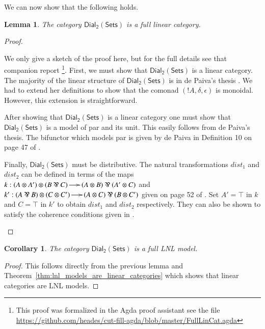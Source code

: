 \documentclass[preprint,6pt]{elsarticle}
\newcommand{\dial}[0]{\mathsf{Dial_2}(\mathsf{Sets})}
\newtheorem{lemma}[theorem]{Lemma}
\newtheorem{corollary}[theorem]{Corollary}
\begin{document}
We can now show that the following holds.
\begin{lemma}
  \label{lemma:ddial_is_a_linear_category}
  The category $\dial$ is a full linear category.
\end{lemma}
\begin{proof}
  \begin{paper}
    We only give a sketch of the proof here, but for the full details
    see that companion report \cite{Eades:2015}\footnote{This proof
      was formalized in the Agda proof assistant see the file
      \url{https://github.com/heades/cut-fill-agda/blob/master/FullLinCat.agda}}. First,
    we must show that $\dial$ is a linear category.  The majority of
    the linear structure of $\dial$ is in de Paiva's thesis
    \cite{dePaiva:1988}.  We had to extend her definitions to show
    that the comonad $(!A,\delta,\epsilon)$ is monoidal. However, this extension
    is straightforward.

    After showing that $\dial$ is a linear category one must show that
    $\dial$ is a model of par and its unit.  This easily follows from
    de Paiva's thesis.  The bifunctor which models par is given by de
    Paiva in Definition 10 on page 47 of \cite{dePaiva:1988}.

    Finally, $\dial$ must be distributive.  The natural
    transformations $dist_1$ and $dist_2$ can be defined in terms of
    the maps $k : (A \otimes A') \otimes (B \parr C) \to (A \otimes B)
    \parr (A' \otimes C)$ and $k' : (A \parr B) \otimes (C \otimes C')
    \to (A \otimes C) \parr (B \otimes C')$ given on page 52 of
    \cite{dePaiva:1988}.  Set $A' = \top$ in $k$ and $C = \top$ in
    $k'$ to obtain $dist_1$ and $dist_2$ respectively.  They can also
    be shown to satisfy the coherence conditions given in
    \cite{Cockett:1997}.
  \end{paper}
  
\end{proof}

\begin{corollary}
  \label{corollary:dial-FLNL}
  The category $\dial$ is a full LNL model.
\end{corollary}
\begin{proof}
  This follows directly from the previous lemma and
  Theorem~\ref{thm:lnl_models_are_linear_categories} which shows that
  linear categories are LNL models.
\end{proof}
\end{document}

